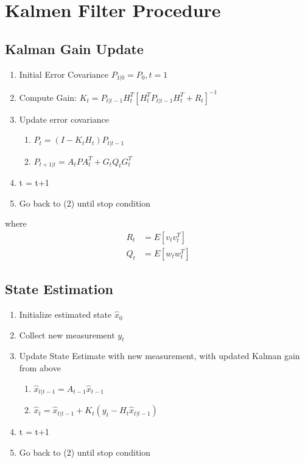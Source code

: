 \documentclass[12pt, letterpaper]{amsart} %
\numberwithin{equation}{section}
\begin{document}
\newpage
\section{Kalmen Filter Procedure}
\subsection{Kalman Gain Update}
\begin{enumerate}
\item Initial Error Covariance $P_{1|0} = P_0, t = 1$
\item Compute Gain: $K_t = P_{t|t-1} H_t^T [H_t^T P_{t|t-1} H_t^T + R_t]^{-1}$
\item Update error covariance
  \begin{enumerate}
  \item $P_t = (I-K_tH_t)P_{t|t-1}$
  \item $P_{t+1|t} = A_t P A_t^T + G_t Q_t G_t^T$
  \end{enumerate}
\item t = t+1
\item Go back to (2) until stop condition
\end{enumerate}
where
\begin{align*}
  R_t &= E[v_t v_t^T] \\
  Q_t &= E[w_t w_t^T]
\end{align*}

\subsection{State Estimation}
\begin{enumerate}
\item Initialize estimated state $\hat{x}_0$
\item Collect new measurement $y_t$
\item Update State Estimate with new measurement, with updated Kalman gain from above
  \begin{enumerate}
  \item $\hat{x}_{t|t-1} = A_{t-1} \hat{x}_{t-1}$ 
  \item $\hat{x}_t = \hat{x}_{t|t-1} + K_t(y_t - H_t \hat{x}_{t|t-1})$
  \end{enumerate}
\item t = t+1
\item Go back to (2) until stop condition  
\end{enumerate}
\newpage
\end{document}
